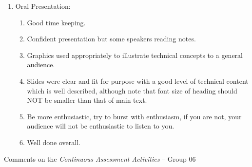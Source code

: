 \documentclass[14pt,twoside]{report}
\begin{document}
\begin{enumerate}
\item Oral Presentation:
\begin{enumerate}
%
\item Good time keeping.
%
\item Confident presentation but some speakers reading notes.
%
\item Graphics used appropriately to illustrate technical concepts to a general audience. 
%
\item Slides were clear and fit for purpose with a good level of technical content which is well described, although note that font size of heading should NOT be smaller than that of main text.
%
\item Be more enthusiastic, try to burst with enthusiasm, if you are not, your audience will not be enthusiastic to listen to you.
%
\item Well done overall.
%
\end{enumerate}

\end{enumerate}


\clearpage



\bigskip

\begin{center}
  {\Large Comments on the {\it Continuous Assessment Activities} -- Group 06}
\end{center}
\end{document}
